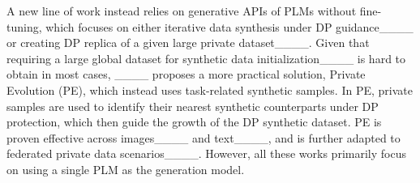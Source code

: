 A new line of work instead relies on generative APIs of PLMs without fine-tuning, which focuses on either iterative data synthesis under DP guidance____ or creating DP replica of a given large private dataset____. %
Given that requiring a large global dataset for synthetic data initialization____ is hard to obtain in most cases, ____ proposes a more practical solution, Private Evolution (PE), which instead uses task-related synthetic samples. In PE, private samples are used to identify their nearest synthetic counterparts under DP protection, which then guide the growth of the DP synthetic dataset. PE is proven effective across images____ and text____, and is further adapted to federated private data scenarios____.
However, all these works primarily focus on using a single PLM as the generation model.

